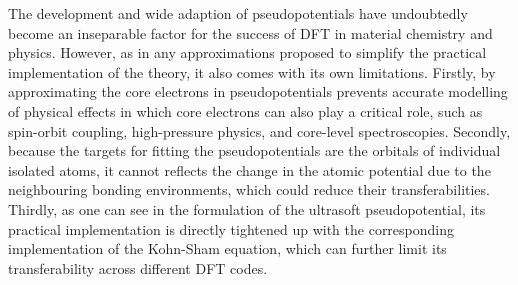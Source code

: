 The development and wide adaption of pseudopotentials have undoubtedly become an inseparable factor for the success of DFT in material chemistry and physics. However, as in any approximations proposed to simplify the practical implementation of the theory, it also comes with its own limitations. Firstly,  by approximating the core electrons in pseudopotentials prevents accurate modelling of physical effects in which core electrons can also play a critical role, such as spin-orbit coupling,\cite{dolg2012relativistic} high-pressure physics,\cite{oganov2003all} and core-level spectroscopies. Secondly, because the targets for fitting the pseudopotentials are the  orbitals of individual isolated atoms, it cannot reflects the change in the atomic potential due to the neighbouring bonding environments, which could reduce their transferabilities. Thirdly, as one can see in the formulation of the ultrasoft pseudopotential, its practical implementation is directly tightened up with the corresponding implementation of the Kohn-Sham equation, which can further limit its  transferability across different DFT codes.   
 